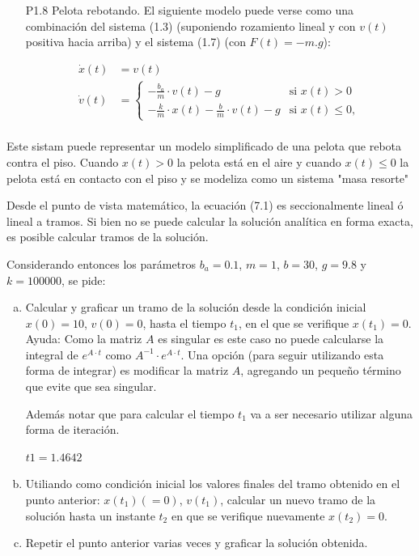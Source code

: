 \documentclass{article}
\begin{document}
\begin{itemize}
   \item[P1.8] Pelota rebotando. El siguiente modelo puede verse como una combinación del sistema (1.3) (suponiendo rozamiento lineal y con $v(t)$ positiva hacia arriba) y el sistema (1.7) (con $F(t)=-m.g$):

\begin{align*}
  \dot{x}(t) &= v(t) \\
 \label{P1.8a} \tag{P1.8a}
  \dot{v}(t) &=   \begin{cases}
    -\frac{b_{a}}{m} \cdot v(t) - g & \text{si } x(t) > 0\\
    -\frac{k}{m} \cdot x(t) - \frac{b}{m} \cdot v(t) - g & \text {si } x(t) \leq 0,
  \end{cases}\\
\end{align*}
\end{itemize}

Este sistam puede representar un modelo simplificado de una pelota que rebota contra el piso. Cuando $x(t) > 0$ la pelota está en el aire y cuando $x(t) \leq 0$ la pelota está en contacto con el piso y se modeliza como un sistema "masa resorte"

Desde el punto de vista matemático, la ecuación (7.1) es seccionalmente lineal ó lineal a tramos. Si bien no se puede calcular la solución analítica en forma exacta, es posible calcular tramos de la solución.

Considerando entonces los parámetros $b_{a} = 0.1$, $m=1$, $b=30$, $g=9.8$ y $k = 100000$, se pide:
\begin{enumerate}[a)]
\item Calcular y graficar un tramo de la solución desde la condición inicial $x(0)=10$, $v(0)=0$, hasta el tiempo $t_{1}$, en el que se verifique $x(t_{1})=0$.
Ayuda: Como la matriz $A$ es singular es este caso no puede calcularse la integral de $e^{A \cdot t}$ como $A^{-1} \cdot e^{A \cdot t}$. Una opción (para seguir utilizando esta forma de integrar) es modificar la matriz $A$, agregando un pequeño término que evite que sea singular.

Además notar que para calcular el tiempo $t_{1}$ va a ser necesario utilizar alguna forma de iteración.

$t1 = 1.4642$

\item Utiliando como condición inicial los valores finales del tramo obtenido en el punto anterior: $x(t_{1})(=0)$, $v(t_{1})$, calcular un nuevo tramo de la solución hasta un instante $t_{2}$ en que se verifique nuevamente $x(t_{2})=0$.

\item Repetir el punto anterior varias veces y graficar la solución obtenida.
\end{enumerate}
\end{document}
